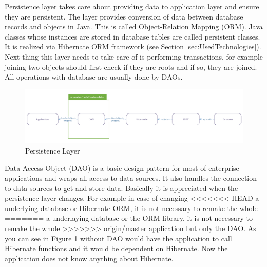 
Persistence layer takes care about providing data to application layer and
ensure they are persistent. The layer provides conversion of data between database
records and objects in Java. This is called Object-Relation Mapping
(ORM). Java classes whose instances are stored in database tables are called
persistent classes. It is realized via Hibernate ORM framework (see Section
\ref{sec:UsedTechnologies}). Next thing this layer needs to take care of is performing transactions,
for example joining two objects should first check if they are roots and if so, they
are joined. All operations with database are usually done by DAOs.

\begin{figure}[!htb]
        \centering
        \includegraphics[width=\textwidth]{Images/PersistentLayer}
        \caption{Persistence Layer}
        \label{fig:PersistentLayer}
\end{figure}

Data Access Object (DAO) is a basic design pattern for most of enterprise
applications and wraps all access to data sources. It also handles the
connection to data sources to get and store data. Basically
it is appreciated when the persistence layer changes. For example in case of changing
<<<<<<< HEAD
a underlying database or Hibernate ORM, it is not necessary to remake the whole
=======
a underlaying database or the ORM library, it is not necessary to remake the whole
>>>>>>> origin/master
application but only the DAO. As you can see in Figure
\ref{fig:PersistentLayer} without DAO would have the application
to call Hibernate functions and it would be dependent on Hibernate. Now the
application does not know anything about Hibernate.


